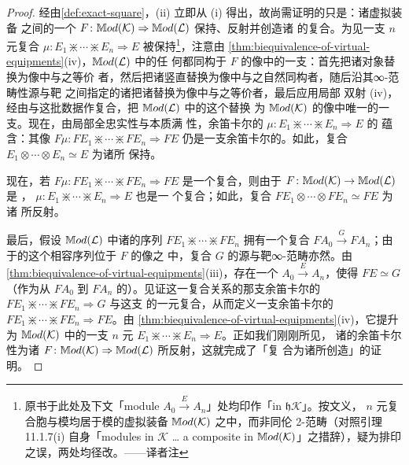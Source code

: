 \begin{proof}
经由\cref{def:exact-square}，(ii) 立即从 (i) 得出，故尚需证明的只是：诸虚拟装备
之间的一个\trBiequivalence{}
$F\colon\mathbb{M}od(\mathcal{K})\Rightarrow\mathbb{M}od(\mathcal{L})$ 保持、反射并创造诸%
\trModule{}的复合。为见一支 $n$ 元复合\trCell{}
$\mu\colon E_{1}\divideontimes\cdots\divideontimes E_{n}\Rightarrow E$
被保持\footnote{原书于此处及下文「module
$A_{0}\xrightarrow{E}A_{n}$」处均印作「in $\mathfrak{h}\mathcal{K}$」。按文义，
$n$ 元复合胞与模均居于模的虚拟装备 $\mathbb{M}od(\mathcal{K})$ 之中，而非同伦
2-范畴（对照引理 11.1.7(i) 自身「modules in $\mathcal{K}$ … a composite in
$\mathbb{M}od(\mathcal{K})$」之措辞），疑为排印之误，两处均径改。——译者注}，注意由
\cref{thm:biequivalence-of-virtual-equipments}(iv)，$\mathbb{M}od(\mathcal{L})$ 中的任
何\trCell{}都同构于 $F$ 的像中的一支\trCell：首先把诸对象替换为像中与之等价
者，然后把诸竖直\trFunctor{}替换为像中与之自然同构者，随后沿其∞-范畴性源与靶
之间指定的诸\trEquivalence{}把诸\trModule{}替换为像中与之等价者，最后应用局部
双射 (iv)，经由与这批数据作复合，把 $\mathbb{M}od(\mathcal{L})$ 中的这个\trCell{}替换
为 $\mathbb{M}od(\mathcal{K})$ 的像中唯一的一支\trCell。现在，由局部全忠实性与本质满
性，余笛卡尔的\trCell{}
$\mu\colon E_{1}\divideontimes\cdots\divideontimes E_{n}\Rightarrow E$ 的%
\trUniversalProperty{}蕴含：其像
$F\mu\colon FE_{1}\divideontimes\cdots\divideontimes FE_{n}\Rightarrow FE$
仍是一支余笛卡尔的\trCell。如此，复合
$E_{1}\otimes\cdots\otimes E_{n}\simeq E$ 为诸\trCosmologicalBiequivalence{}所
保持。

现在，若
$F\mu\colon FE_{1}\divideontimes\cdots\divideontimes FE_{n}\Rightarrow FE$
是一个复合，则由于 $F\colon\mathbb{M}od(\mathcal{K})\to\mathbb{M}od(\mathcal{L})$ 是%
\trLocallyFullyFaithful{}，
$\mu\colon E_{1}\divideontimes\cdots\divideontimes E_{n}\Rightarrow E$ 也是一
个复合；如此，复合
$FE_{1}\otimes\cdots\otimes FE_{n}\simeq FE$ 为诸\trCosmologicalBiequivalence{}%
所反射。

最后，假设 $\mathbb{M}od(\mathcal{L})$ 中诸\trModule{}的序列
$FE_{1}\divideontimes\cdots\divideontimes FE_{n}$ 拥有一个复合
$FA_{0}\xrightarrow{G}FA_{n}$；由于\trModule{}的这个相容序列位于 $F$ 的像之
中，复合\trModule{} $G$ 的源与靶∞-范畴亦然。由
\cref{thm:biequivalence-of-virtual-equipments}(iii)，存在一个\trModule{}
$A_{0}\xrightarrow{E}A_{n}$，使得 $FE\simeq G$（作为从 $FA_{0}$ 到 $FA_{n}$
的\trModule）。见证这一复合关系的那支余笛卡尔的\trCell{}
$FE_{1}\divideontimes\cdots\divideontimes FE_{n}\Rightarrow G$ 与这支%
\trEquivalence{}的一元\trCell{}复合，从而定义一支余笛卡尔的\trCell{}
$FE_{1}\divideontimes\cdots\divideontimes FE_{n}\Rightarrow FE$。由
\cref{thm:biequivalence-of-virtual-equipments}(iv)，它提升为 $\mathbb{M}od(\mathcal{K})$
中的一支 $n$ 元\trCell{}
$E_{1}\divideontimes\cdots\divideontimes E_{n}\Rightarrow E$。正如我们刚刚所见，
诸\trCell{}的余笛卡尔性为诸\trBiequivalence{}
$F\colon\mathbb{M}od(\mathcal{K})\Rightarrow\mathbb{M}od(\mathcal{L})$ 所反射，这就完成了「复
合为诸\trCosmologicalBiequivalence{}所创造」的证明。
\end{proof}

